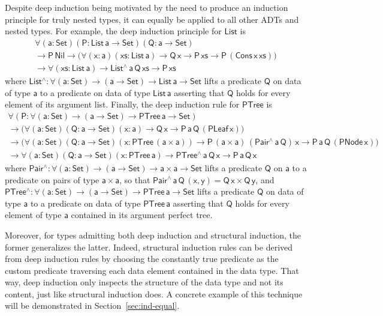 \documentclass[acmsmall,screen,review,anonymous]{acmart}
\theoremstyle{definition}
\begin{document}
Despite deep induction being motivated by the need to produce an induction principle for truly nested types,
it can equally be applied to all other ADTs and nested types.
For example, the deep induction principle for $\mathsf{List}$ is
\begin{multline}
\mathsf{\forall (a : Set) (P : List\, a \to Set) (Q : a \to Set)} \\
\mathsf{\to P\,Nil \to \big( \forall (x : a) (xs: List\,a) \to Q\,x \to P\,xs \to P\,(Cons\,x\,xs)\big)} \\
\mathsf{\to \forall (xs : List\,a) \to List^{\wedge}\,a\,Q\,xs \to P\, xs }
\end{multline}
where $\mathsf{List^{\wedge} : \forall (a : Set) \to (a \to Set) \to List\,a \to Set}$ lifts a predicate $\mathsf{Q}$ on data of type $\mathsf{a}$ to a predicate on data of type $\mathsf{List\,a}$ asserting that $\mathsf{Q}$ holds for every element of its argument list.
Finally, the deep induction rule for $\mathsf{PTree}$ is
\begin{multline}
\mathsf{\forall (P : \forall (a : Set) \to (a \to Set) \to PTree\, a \to Set)} \\
\mathsf{\to \big( \forall (a : Set) (Q : a \to Set) (x : a) \to Q\,x \to P\,a\,Q\,(PLeaf\, x) \big)} \\
\mathsf{\to \big( \forall (a : Set) (Q : a \to Set) (x : PTree\,(a \times a)) \to P\,(a \times a)\,(Pair^{\wedge}\,a\,Q)\,x \to P\,a\,Q\,(PNode\,x)\big)} \\
\mathsf{\to \forall (a : Set) (Q : a \to Set) (x : PTree\,a) \to PTree^{\wedge}\,a\,Q\,x \to P\,a\,Q\,x }
\end{multline}
where $\mathsf{Pair^{\wedge} : \forall (a : Set) \to (a \to Set) \to a \times a \to Set}$ lifts a predicate $\mathsf{Q}$ on $\mathsf{a}$ to a predicate on pairs of type $\mathsf{a \times a}$,
so that $\mathsf{Pair^{\wedge}\,a\,Q\,(x,y) = Q\,x \times Q\,y}$,
and $\mathsf{PTree^{\wedge} : \forall (a : Set) \to (a \to Set) \to PTree\,a \to Set}$ lifts a predicate $\mathsf{Q}$ on data of type $\mathsf{a}$ to a predicate on data of type $\mathsf{PTree\,a}$ asserting that $\mathsf{Q}$ holds for every element of type $\mathsf{a}$ contained in its argument perfect tree.

{\color{blue} Moreover, for types admitting both deep induction and structural induction, the former generalizes the latter.
Indeed, structural induction rules can be derived from deep induction rules by choosing the constantly true predicate as the custom predicate traversing each data element contained in the data type.
That way, deep induction only inspects the structure of the data type and not its content, just like structural induction does.
A concrete example of this technique will be demonstrated in Section~\ref{sec:ind-equal}.}
\end{document}
